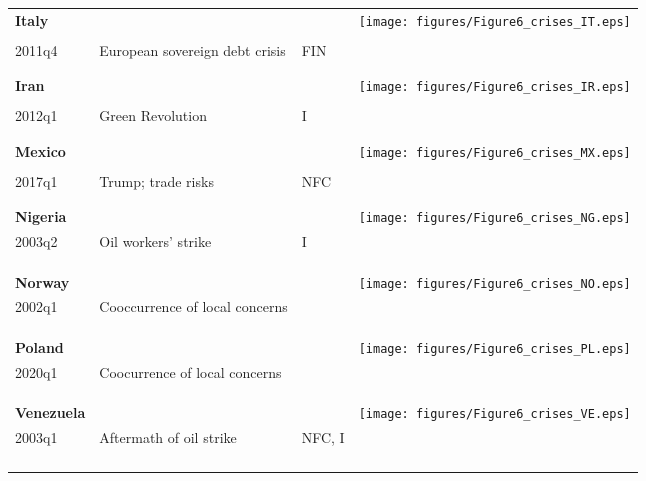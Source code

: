 \documentclass[12pt,oneside,leqno]{article}
\begin{document}
\begin{figure}[!h]
{\begin{threeparttable}
\begin{tabular}{p{.2\linewidth}p{.36\linewidth}p{.1\linewidth}p{.33\linewidth}}
\textbf{Italy} & & & \multirow{4}{*}{\texttt{[image: figures/Figure6\_crises\_IT.eps]}} \\\\
\quad 2011q4 & European sovereign debt crisis & FIN \\\\\\\addlinespace
\textbf{Iran} & & & \multirow{4}{*}{\texttt{[image: figures/Figure6\_crises\_IR.eps]}} \\\\
\quad 2012q1 & Green Revolution & I \\\\\\\addlinespace
\textbf{Mexico} & & & \multirow{4}{*}{\texttt{[image: figures/Figure6\_crises\_MX.eps]}} \\\\
\quad 2017q1 & Trump; trade risks & NFC \\\\\\\addlinespace
\textbf{Nigeria} & & & \multirow{4}{*}{\texttt{[image: figures/Figure6\_crises\_NG.eps]}} \\
\quad 2003q2 & Oil workers' strike & I \\\\\\\\\addlinespace
\textbf{Norway} & & & \multirow{4}{*}{\texttt{[image: figures/Figure6\_crises\_NO.eps]}} \\
\quad 2002q1 & Cooccurrence of local concerns \\\\\\\\\addlinespace
\textbf{Poland} & & & \multirow{4}{*}{\texttt{[image: figures/Figure6\_crises\_PL.eps]}} \\
\quad 2020q1 & Coocurrence of local concerns \\\\\\\\\addlinespace
\textbf{Venezuela} & & & \multirow{4}{*}{\texttt{[image: figures/Figure6\_crises\_VE.eps]}} \\
\quad 2003q1 & Aftermath of oil strike & NFC, I \\\\\\\\\addlinespace


\end{tabular}
\end{threeparttable}}
\end{figure}
\end{document}
